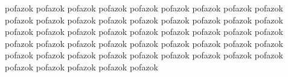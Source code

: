 \documentclass[12pt]{article}
\begin{document}
\marginpar{\hrulefill}
pofazok pofazok pofazok pofazok pofazok pofazok pofazok pofazok pofazok pofazok
pofazok pofazok pofazok pofazok pofazok pofazok pofazok pofazok pofazok pofazok
pofazok pofazok pofazok pofazok pofazok pofazok pofazok pofazok pofazok pofazok
pofazok pofazok pofazok pofazok pofazok pofazok pofazok pofazok pofazok pofazok
pofazok pofazok pofazok pofazok pofazok pofazok pofazok pofazok pofazok pofazok
\end{document}

